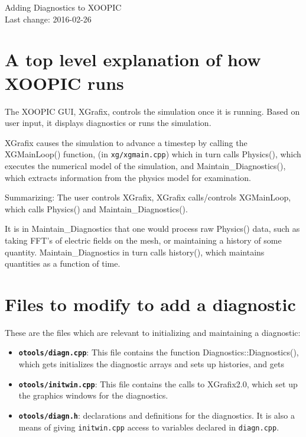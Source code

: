 \pagestyle{empty}
\topmargin -0.60in
\oddsidemargin 0.0625in
\textheight 9.00in
\textwidth 6.50in
\renewcommand{\baselinestretch}{1.4}
\parskip 0.20in


\pagestyle{plain}

\begin{center}
\Huge
Adding Diagnostics to XOOPIC
\\[10mm]
\large
Last change: 2016-02-26
\end{center}

\section{A top level explanation of how XOOPIC runs}

The XOOPIC GUI, XGrafix, controls the simulation once it is running.
Based on user input, it displays diagnostics or runs the simulation.

XGrafix causes the simulation to advance a timestep by calling the
XGMainLoop() function, (in {\tt xg/xgmain.cpp}) which in turn calls Physics(),
which executes the numerical model of the simulation, and 
Maintain\_Diagnostics(), which extracts information from the physics
model for examination.

Summarizing:
The user controls XGrafix, XGrafix calls/controls XGMainLoop, which
calls Physics() and Maintain\_Diagnostics().

It is in Maintain\_Diagnostics that one would process raw Physics() data,
such as taking FFT's of electric fields on the mesh, or maintaining
a history of some quantity.  Maintain\_Diagnostics in turn calls history(),
which maintains quantities as a function of time.

\section{Files to modify to add a diagnostic}

These are the files which are relevant to initializing and maintaining
a diagnostic:
\begin{itemize}
  \item {\bf {\tt otools/diagn.cpp}}:  This file contains the function
  Diagnostics::Diagnostics(), which gets initializes the diagnostic arrays and
  sets up histories, and gets 

  \item {\bf {\tt otools/initwin.cpp}}:  This file contains the calls to
  XGrafix2.0, which set up the graphics windows for the diagnostics. 

  \item {\bf {\tt otools/diagn.h}}:  declarations and definitions for the
  diagnostics. It is also a means of giving {\tt initwin.cpp} access to
  variables declared in {\tt diagn.cpp}.
\end{itemize}

